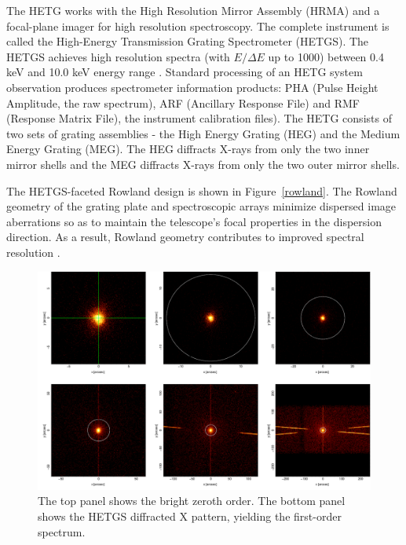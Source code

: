 The HETG works with the High Resolution Mirror Assembly (HRMA) and a focal-plane imager for high resolution spectroscopy. The complete instrument is called the High-Energy Transmission Grating Spectrometer (HETGS). The HETGS achieves high resolution spectra (with $E/\Delta E$ up to 1000) between 0.4 keV and 10.0 keV energy range \citep{ChandraMSFC}. Standard processing of an HETG system observation produces spectrometer information products: PHA (Pulse Height Amplitude, the raw spectrum), ARF (Ancillary Response File) and RMF (Response Matrix File), the instrument calibration files). The HETG consists of two sets of grating assemblies - the High Energy Grating (HEG) and the Medium Energy Grating (MEG). The HEG diffracts X-rays from only the two inner mirror shells and the MEG diffracts X-rays from only the two outer mirror shells. \par
The HETGS-faceted Rowland design is shown in Figure~\ref{rowland}. The Rowland geometry of the grating plate and spectroscopic arrays minimize dispersed image aberrations so as to maintain the telescope's focal properties in the dispersion direction. As a result, Rowland geometry contributes to improved spectral resolution \citep{ChandraMSFC}. 


\begin{figure}[ht!]
\centering
  \includegraphics[scale=.3]{Chapters/Figures/X_orders.png}
  \caption{The top panel shows the bright zeroth order. The bottom panel shows the HETGS diffracted X pattern, yielding the first-order spectrum. }
  \label{xpattern}
\end{figure}

